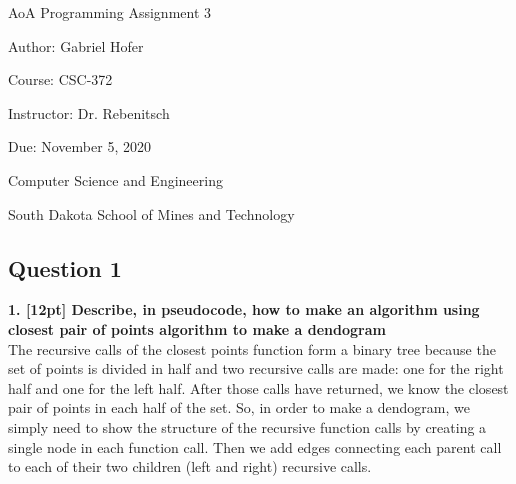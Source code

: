 \documentclass[12pt]{article}
\begin{document}
\begin{titlepage}
   \begin{center}
       \vspace*{1cm}
       \Large
       AoA Programming Assignment 3
       \normalsize

       \vspace{0.5cm}

       Author: Gabriel Hofer

       \vspace{0.5cm}

       Course: CSC-372

       \vspace{0.5cm}

       Instructor: Dr. Rebenitsch
       \vspace{0.5cm}

       Due: November 5, 2020

       \vfill

       Computer Science and Engineering\

       South Dakota School of Mines and Technology\
   \end{center}
\end{titlepage}
\newpage
\footnotesize
\newpage
\subsection*{Question 1}

\textbf{1. [12pt] Describe, in pseudocode, how to make an algorithm using closest pair of points 
algorithm to make a dendogram} \\

The recursive calls of the closest points function form a binary tree because the set of points is 
divided in half and two recursive calls are made: one for the right half and one for the left half. 
After those calls have returned, we know the closest pair of points in each half of the set. 
So, in order to make a dendogram, we simply need to show the structure of the recursive function calls by 
creating a single node in each function call. 
Then we add edges connecting each parent call to each of their two children (left and right) recursive calls. 
\end{document}
